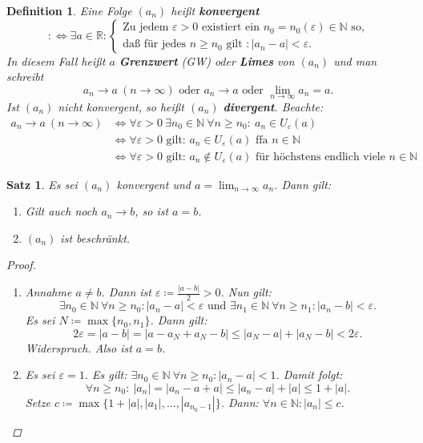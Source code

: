 \documentclass[12pt]{extreport} %
\newcommand{\N}{\mathbb{N}}
\newcommand{\R}{\mathbb{R}}
\theoremstyle{named}
\theoremstyle{itshape}
\newtheorem{satz}[unnamedtheorem]{Satz}
\newtheorem*{definition}{Definition}
\theoremstyle{normal}
\begin{document}
   
\begin{definition}
	Eine Folge $(a_{n})$ hei{\ss}t \textbf{konvergent}
	$$ :\iff \exists a \in \R : \begin{cases} \text{Zu jedem } \varepsilon > 0 \text{ existiert ein } n_{0} = n_{0}(\varepsilon) \in \N \text{ so,} \\
		\text{da{\ss} für jedes } n \geq n_{0} \text{ gilt }: |a_{n} - a| < \varepsilon.
	\end{cases} $$
	In diesem Fall hei{\ss}t $a$ \textbf{Grenzwert} (GW) oder \textbf{Limes} von $(a_{n})$ und man schreibt
	$$ 
		a_{n} \rightarrow a ~(n \rightarrow \infty) \text{ oder } a_{n} \rightarrow a \text{ oder } \lim_{n \rightarrow \infty} a_{n} = a.
	$$
	Ist $(a_{n})$ nicht konvergent, so hei{\ss}t $(a_{n})$ \textbf{divergent}. Beachte:
	\begin{align*}
		a_{n} \rightarrow a ~(n \rightarrow \infty) & \iff \forall \varepsilon > 0 ~\exists n_{0} \in \N ~\forall n \geq n_{0}: ~a_{n} \in U_{\varepsilon}(a) \\
				& \iff \forall \varepsilon > 0 \text{ gilt: } a_{n} \in U_{\varepsilon}(a) \text{ ffa } n \in \N \\
				& \iff \forall \varepsilon > 0 \text{ gilt: } a_{n} \notin U_{\varepsilon}(a) \text{ für höchstens endlich viele } n \in \N
	\end{align*}
\end{definition}


\begin{satz} \label{2.1:satz}
	Es sei $(a_{n})$ konvergent und $a = \lim_{n \rightarrow \infty} a_{n}$. Dann gilt:
	\begin{enumerate}
		\item Gilt auch noch $a_{n} \rightarrow b$, so ist $a = b$.
		\item $(a_{n})$ ist beschränkt. \label{2.1.b:satz}
	\end{enumerate}
	
	\begin{proof}\
	  \begin{enumerate}
		\item Annahme $a \neq b$. Dann ist $\varepsilon \coloneqq \frac{|a - b|}{2} > 0$. Nun gilt:
			$$
			\exists n_{0} \in \N ~ \forall n \geq n_{0}: |a_n - a| < \varepsilon \text{ und } 
			\exists n_{1} \in \N ~ \forall n \geq n_{1}: |a_n - b| < \varepsilon. 
			$$
			Es sei $N \coloneqq \max \{ n_{0}, n_{1} \}$. Dann gilt:
			$$
				2 \varepsilon = |a - b| = | a - a_{N} + a_{N} - b| \leq |a_{N} - a| + |a_{N} - b| < 2 \varepsilon.
			$$
			Widerspruch. Also ist $ a = b$.
		\item   Es sei $\varepsilon = 1$. Es gilt: $\exists n_{0} \in \N ~\forall n \geq n_{0}: |a_{n} - a| < 1$. Damit folgt:
			$$
				\forall n \geq n_{0}: ~ |a_{n}| = |a_{n} - a + a| \leq |a_{n} - a| + |a| \leq 1 + |a|.
			$$
			Setze $c \coloneqq \max \{ 1 + |a|, |a_{1}|, \dotsc, |a_{n_{0} - 1}| \}$. Dann: $\forall n \in \N: |a_{n}| \leq c$.
	  \end{enumerate}
	\end{proof}	
\end{satz}
\end{document}
